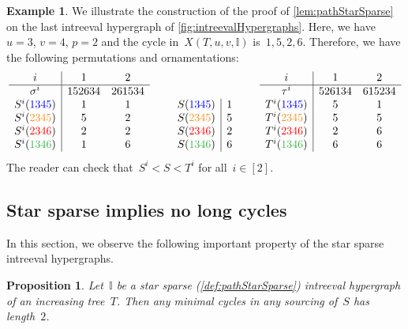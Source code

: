 \documentclass{amsart}
\newtheorem{proposition}[theorem]{Proposition}
\theoremstyle{definition}
\newtheorem{example}[theorem]{Example}
\newcommand{\blue}[1]{{\color{blue} #1}} %
\newcommand{\red}[1]{{\color{red} #1}} %
\newcommand{\green}[1]{{\color{green} #1}} %
\newcommand{\orange}[1]{{\color{orange} #1}} %
\newcommand{\purple}[1]{{\color{purple} #1}} %
\newcommand{\II}{\mathbb I} %
\begin{document}
\begin{example}
\label{exm:pathStarSparse}
We illustrate the construction of the proof of \cref{lem:pathStarSparse} on the last intreeval hypergraph of \cref{fig:intreevalHypergraphs}.
Here, we have~$u = 3$, $v = 4$, $p = 2$ and the cycle in~$X(T, u, v, \II)$ is~$1, 5, 2, 6$.
Therefore, we have the following permutations and ornamentations:
\[
\begin{array}[b]{c|cc}
	i & 1 & 2 \\ 
	\hline
	\sigma^i & 152634 & 261534 \\
	S^i(\blue{1345}) & 1 & 1 \\
	S^i(\orange{2345}) & 5 & 2 \\
	S^i(\red{2346}) & 2 & 2 \\
	S^i(\green{1346}) & 1 & 6 \\
\end{array}
\qquad
\begin{array}[b]{c|c}
	S(\blue{1345}) & 1 \\
	S(\orange{2345}) & 5 \\
	S(\red{2346}) & 2 \\
	S(\green{1346}) & 6 \\
\end{array}
\qquad
\begin{array}[b]{c|cc}
	i & 1 & 2 \\ 
	\hline
	\tau^i & 526134 & 615234 \\
	T^i(\blue{1345}) & 5 & 1 \\
	T^i(\orange{2345}) & 5 & 5 \\
	T^i(\red{2346}) & 2 & 6 \\
	T^i(\green{1346}) & 6 & 6 \\
\end{array}
\]
The reader can check that~$S^i < S < T^i$ for all~$i \in [2]$.
\end{example}


\subsection{Star sparse implies no long cycles}
\label{subsec:shortCycles}

In this section, we observe the following important property of the star sparse intreeval hypergraphs.

\begin{proposition}
\label{prop:pathStarSparse}
Let~$\II$ be a star sparse (\cref{def:pathStarSparse}) intreeval hypergraph of an increasing tree~$T$.
Then any minimal cycles in any sourcing of~$S$ has length~$2$.
\end{proposition}
\end{document}

